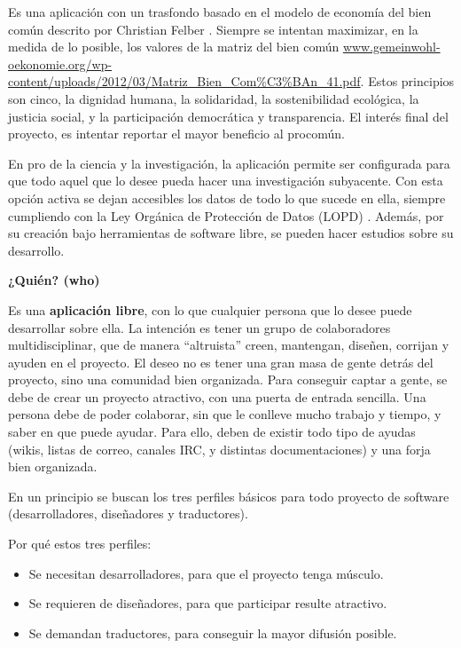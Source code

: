 \documentclass[a4paper, 12pt]{book}
\begin{document}
Es una aplicación con un trasfondo basado en el modelo de economía del 
bien común descrito por Christian Felber \cite{Christian Felber}. Siempre 
se intentan maximizar, en la medida de lo posible, los valores de la matriz del 
bien común 
\url{www.gemeinwohl-oekonomie.org/wp-content/uploads/2012/03/Matriz\_Bien\_Com\%C3\%BAn\_41.pdf}. 
Estos principios son cinco, la dignidad humana, la solidaridad, 
la sostenibilidad ecológica, la justicia social, y la participación democrática 
y transparencia. El interés final del proyecto, es intentar reportar el mayor 
beneficio al procomún.

En pro de la ciencia y la investigación, la aplicación permite ser configurada 
para que todo aquel que lo desee pueda hacer una investigación subyacente. 
Con esta opción activa se dejan accesibles los datos de todo lo que sucede en 
ella, siempre cumpliendo con la Ley Orgánica de Protección de Datos (LOPD) 
\cite{LOPD}. Además, por su creación bajo herramientas de software libre, 
se pueden hacer estudios sobre su desarrollo.

\textbf{¿Quién? (who)}

Es una \textbf{aplicación libre}, con lo que cualquier persona que lo desee 
puede desarrollar sobre ella. La intención es tener un grupo de colaboradores 
multidisciplinar, que de manera ``altruista'' creen, mantengan, diseñen, 
corrijan y ayuden en el proyecto. El deseo no es tener una gran masa de gente 
detrás del proyecto, sino una comunidad bien organizada. Para conseguir captar 
a gente, se debe de crear un proyecto atractivo, con una puerta de entrada 
sencilla. Una persona debe de poder colaborar, sin que le conlleve mucho 
trabajo y tiempo, y saber en que puede ayudar. Para ello, deben de existir todo 
tipo de ayudas (wikis, listas de correo, canales IRC, y distintas 
documentaciones) y una forja bien organizada.

En un principio se buscan los tres perfiles básicos para todo proyecto de 
software (desarrolladores, diseñadores y traductores).

Por qué estos tres perfiles:
\begin{itemize}
    \item Se necesitan desarrolladores,  para que el proyecto tenga músculo.
    \item Se requieren de diseñadores, para que participar resulte atractivo.
    \item Se demandan traductores, para conseguir la mayor difusión posible.
\end{itemize}
\end{document}
